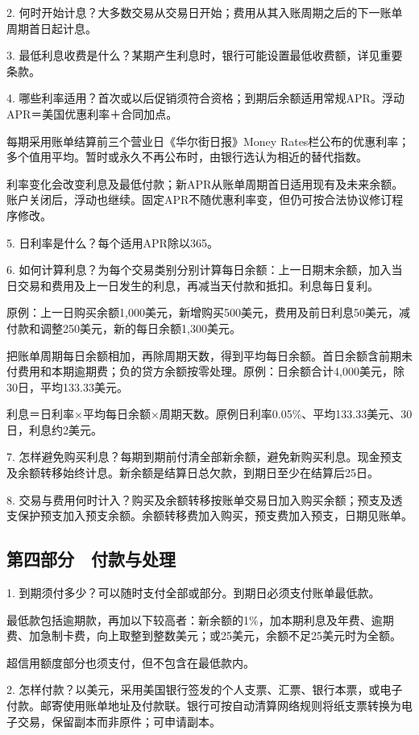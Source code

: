 \documentclass[UTF8,fontset=none,11pt,a4paper]{ctexart}
\begin{document}
2. 何时开始计息？大多数交易从交易日开始；费用从其入账周期之后的下一账单周期首日起计息。


3. 最低利息收费是什么？某期产生利息时，银行可能设置最低收费额，详见重要条款。


4. 哪些利率适用？首次或以后促销须符合资格；到期后余额适用常规APR。浮动APR＝美国优惠利率＋合同加点。


每期采用账单结算前三个营业日《华尔街日报》Money Rates栏公布的优惠利率；多个值用平均。暂时或永久不再公布时，由银行选认为相近的替代指数。


利率变化会改变利息及最低付款；新APR从账单周期首日适用现有及未来余额。账户关闭后，浮动也继续。固定APR不随优惠利率变，但仍可按合法协议修订程序修改。


5. 日利率是什么？每个适用APR除以365。


6. 如何计算利息？为每个交易类别分别计算每日余额：上一日期末余额，加入当日交易和费用及上一日发生的利息，再减当天付款和抵扣。利息每日复利。


原例：上一日购买余额1,000美元，新增购买500美元，费用及前日利息50美元，减付款和调整250美元，新的每日余额1,300美元。


把账单周期每日余额相加，再除周期天数，得到平均每日余额。首日余额含前期未付费用和本期逾期费；负的贷方余额按零处理。原例：日余额合计4,000美元，除30日，平均133.33美元。


利息＝日利率×平均每日余额×周期天数。原例日利率0.05\%、平均133.33美元、30日，利息约2美元。


7. 怎样避免购买利息？每期到期前付清全部新余额，避免新购买利息。现金预支及余额转移始终计息。新余额是结算日总欠款，到期日至少在结算后25日。


8. 交易与费用何时计入？购买及余额转移按账单交易日加入购买余额；预支及透支保护预支加入预支余额。余额转移费加入购买，预支费加入预支，日期见账单。


\subsection*{第四部分　付款与处理}
1. 到期须付多少？可以随时支付全部或部分。到期日必须支付账单最低款。


最低款包括逾期款，再加以下较高者：新余额的1\%，加本期利息及年费、逾期费、加急制卡费，向上取整到整数美元；或25美元，余额不足25美元时为全额。


超信用额度部分也须支付，但不包含在最低款内。


2. 怎样付款？以美元，采用美国银行签发的个人支票、汇票、银行本票，或电子付款。邮寄使用账单地址及付款联。银行可按自动清算网络规则将纸支票转换为电子交易，保留副本而非原件；可申请副本。
\end{document}
